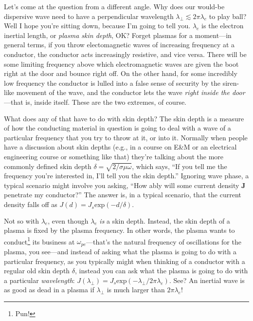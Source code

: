 Let's come at the question from a different angle. Why does our would-be
dispersive \Alf wave need to have a perpendicular wavelength
$\lambda_\perp \lesssim 2 \pi \lambda_e$ to play ball? Well I hope you're
sitting down, because I'm going to tell you. $\lambda_e$ is the electron
inertial length, or \emph{plasma skin depth}, OK? Forget plasmas for a
moment---in general terms, if you throw electomagnetic waves of increasing
frequency at a conductor, the conductor acts increasingly resistive, and vice
versa. There will be some limiting frequency above which electromagnetic waves
are given the boot right at the door and bounce right off. On the other hand,
for some incredibly low frequency the conductor is lulled into a false sense of
security by the siren-like movement of the wave, and the conductor lets the wave
\emph{right inside the door}---that is, inside itself. These are the two
extremes, of course.

What does any of that have to do with skin depth? The skin depth is a measure of
how the conducting material in question is going to deal with a wave of a
particular frequency that you try to throw at it, or into it. Normally when
people have a discussion about skin depths (e.g., in a course on E\&M or an
electrical engineering course or something like that) they're talking about the
more commonly defined skin depth $\delta = \sqrt{2 / \sigma \mu \omega}$, which
says, ``If you tell me the frequency you're interested in, I'll tell you the
skin depth.'' Ignoring wave phase, a typical scenario might involve you asking,
``How ably will some current density $\mathbf{J}$ penetrate my conductor?'' The
answer is, in a typical scenario, that the current density falls off as $J (d) =
J_s \mathrm{exp} ( - d / \delta )$.

Not so with $\lambda_e$, even though $\lambda_e$ \emph{is} a skin
depth. Instead, the skin depth of a plasma is fixed by the plasma frequency. In
other words, the plasma wants to conduct\footnote{Pun!} its business at
$\omega_{pe}$---that's the natural frequency of oscillations for the plasma, you
see---and instead of asking what the plasma is going to do with a particular
frequency, as you typically might when thinking of a conductor with a regular
old skin depth $\delta$, instead you can ask what the plasma is going to do with
a particular \emph{wavelength}:
$J ( \lambda_\perp ) = J_s \mathrm{exp} ( - \lambda_\perp / 2 \pi \lambda_e )$.
See? An inertial \Alf wave is as good as dead in a plasma if $\lambda_\perp$ is
much larger than $2 \pi \lambda_e$!

